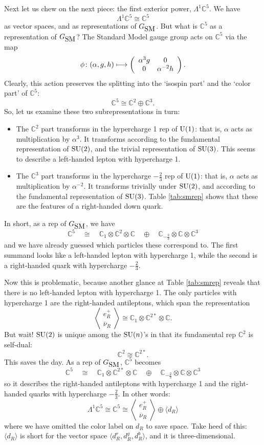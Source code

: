 \documentclass{article}
\newcommand{\maps}{\colon}    %
\newcommand{\C}{{\mathbb C}}  %
\newcommand{\U}{{\rm U}}    %
\newcommand{\SU}{{\rm SU}}    %
\newcommand{\Ex}{\Lambda} %
\newcommand{\iso}{\cong} %
\newcommand{\twothirds}{\frac{2}{3}} %
\newcommand{\GSM}{{G_{\mbox{\rm SM}}}}  %
\newcommand{\nubar}{\overline{\nu}} %
\newcommand{\angantilep}{\left\langle \! \begin{array}{c} e^+_R \\ \nubar_R \end{array} \! \right\rangle} %
\begin{document}
Next let us chew on the next piece: the first exterior power, $\Ex^1
\C^5$.  We have
\[ \Ex^1 \C^5 \iso \C^5 \]
as vector spaces, and as representations of $\GSM$.  But what is $\C^5$ as
a representation of $\GSM$?  The Standard Model gauge group acts on 
$\C^5$ via the map
\[ \phi \maps (\alpha, g, h) \longmapsto 
\left( 
\begin{array}{c c}
\alpha^{3}g & 0 \\
0 & \alpha^{-2}h
\end{array}
\right) .
\]
Clearly, this action preserves the splitting into the `isospin part'
and the `color part' of $\C^5$:
\[ \C^5 \iso \C^2 \oplus \C^3 .\]
So, let us examine these two subrepresentations in turn:
\begin{itemize}
	\item The $\C^2$ part transforms in the hypercharge 1 rep of $\U(1)$:
		that is, $\alpha$ acts as multiplication by $\alpha^3$.  It
		transforms according to the fundamental representation of
		$\SU(2)$, and the trivial representation of $\SU(3)$.  This
		seems to describe a left-handed lepton with hypercharge 1.

	\item The $\C^3$ part transforms in the hypercharge $-\twothirds$ rep
		of $\U(1)$: that is, $\alpha$ acts as multiplication by
		$\alpha^{-2}$.  It transforms trivially under $\SU(2)$, and
		according to the fundamental representation of $\SU(3)$.  Table
		\ref{tab:smrep} shows that these are the features of a
		right-handed down quark.
\end{itemize}

In short, as a rep of $\GSM$, we have
\[ \C^5 \quad \iso \quad 
\C_1 \otimes \C^2 \otimes \C \quad \oplus 
\quad \C_{-\twothirds} \otimes \C \otimes \C^3 \]
and we have already guessed which particles these correspond to. 
The first summand looks like a left-handed lepton with hypercharge 1, 
while the second is a right-handed quark with hypercharge $-\twothirds$.

Now this is problematic, because another glance at Table \ref{tab:smrep}
reveals that there is no left-handed lepton with 
hypercharge 1.  The only particles with hypercharge 1 are the right-handed 
antileptons, which span the representation
\[ \angantilep \iso \C_1 \otimes \C^{2*} \otimes \C. \]
But wait! $\SU(2)$ is unique among the $\SU(n)$'s in that its fundamental rep
$\C^2$ is self-dual:
\[ \C^2 \iso \C^{2*}. \]
This saves the day. As a rep of $\GSM$, $\C^5$ becomes
\[ \C^5 \quad \iso \quad
\C_1 \otimes \C^{2*} \otimes \C \quad \oplus \quad 
\C_{-\twothirds} \otimes \C \otimes \C^3 \]
so it describes the right-handed antileptons with hypercharge 1 
and the right-handed quarks with hypercharge $-\twothirds$. 
In other words:
\[ \Ex^1 \C^5 \iso \C^5 \iso \angantilep \oplus \langle d_R \rangle \]
where we have omitted the color label on $d_R$ to save space. Take heed of 
this: $\langle d_R \rangle$ is short for the vector space
$\langle d^r_R, d^g_R, d^b_R \rangle$, and it is three-dimensional.
\end{document}

